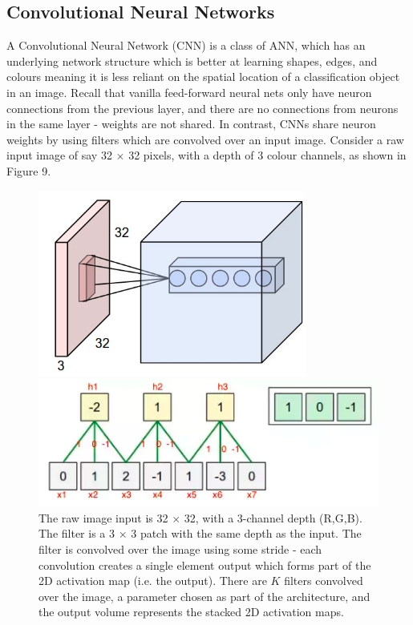 \documentclass[a4paper]{article}
\begin{document}
\subsection{Convolutional Neural Networks}
A Convolutional Neural Network (CNN) is a class of ANN, which has an underlying network structure which is better at learning shapes, edges, and colours meaning it is less reliant on the spatial location of a classification object in an image. Recall that vanilla feed-forward neural nets only have neuron connections from the previous layer, and there are no connections from neurons in the same layer - weights are not shared. In contrast, CNNs share neuron weights by using filters which are convolved over an input image. Consider a raw input image of say 32 $\times$ 32 pixels, with a depth of 3 colour channels, as shown in Figure 9.
\begin{figure}[h]
\begin{minipage}{0.45\textwidth}
\centering
\includegraphics[scale=0.4]{CNN}
\caption{The raw image input is 32 $\times$ 32, with a 3-channel depth (R,G,B). The filter is a 3 $\times$ 3 patch with the same depth as the input. The filter is convolved over the image using some stride - each convolution creates a single element output which forms part of the 2D activation map (i.e. the output). There are $K$ filters convolved over the image, a parameter chosen as part of the architecture, and the output volume represents the stacked 2D activation maps.}
\vspace{0.5cm}
\end{minipage}
\hspace{1cm}
\begin{minipage}{0.45\textwidth}
\centering
\includegraphics[scale=0.43]{CNN_example}

\end{minipage}
\end{figure}
\end{document}
